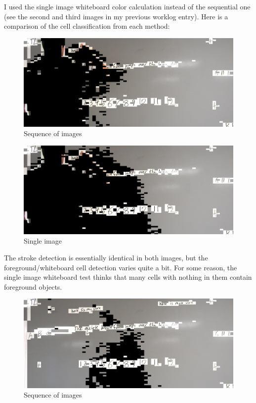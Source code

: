 \documentclass[]{article}
\begin{document}
		 	I used the single image whiteboard color calculation instead of the sequential one (see the second and third images in my previous worklog entry).  Here is a comparison of the cell classification from each method:
		 	
\begin{figure}[H]
\centering
\includegraphics[scale=0.25]{images/griffin_foreground1}
\caption{Sequence of images}
\end{figure}
		
\begin{figure}[H]
\centering
\includegraphics[scale=0.25]{images/griffin_foreground2}
\caption{Single image}
\end{figure}	
	
	The stroke detection is essentially identical in both images, but the foreground/whiteboard cell detection varies quite a bit.  For some reason, the single image whiteboard test thinks that many cells with nothing in them contain foreground objects.
	
\begin{figure}[H]
\centering
\includegraphics[scale=0.25]{images/emptyboard_overtime}
\caption{Sequence of images}
\end{figure}
		
\end{document}
